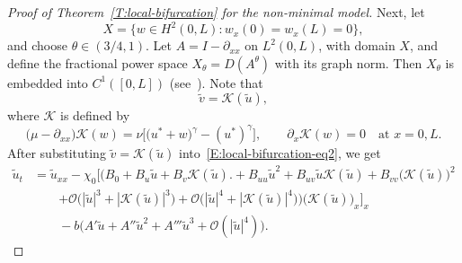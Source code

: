 \documentclass[11pt]{article} %
\theoremstyle{remark}
\theoremstyle{remark}
\numberwithin{equation}{section}
\numberwithin{figure}{section}
\numberwithin{table}{section}
\begin{document}
\begin{proof}[Proof of Theorem~\ref{T:local-bifurcation}  for the non-minimal model]
  Next, let
  \[
    X=\Big\{w\in H^2(0,L):w_x(0)=w_x(L)=0\Big\},
  \]
  and choose $\theta \in (3/4, 1)$.  Let  $A = I - \partial_{xx}$ on $L^2(0,L)$,
  with domain $X$, and define the fractional power space $X_\theta =
  D(A^\theta)$ with its graph norm. Then $X_\theta$ is embedded into $C^1([0,
  L])$ (see~\cite[Theorem 1.6.1]{henry:81:geometric}). Note that
  \[
    \tilde{v}=\mathcal{K}(\tilde{u}),
  \]
  where $\mathcal{K}$ is defined by
  \begin{equation}\label{E:K-operator-eq}
    \Big(\mu-\partial_{xx}\Big)\mathcal{K}(w)
    =\nu\Big[\Big(u^*+w\Big)^\gamma-(u^*)^\gamma\Big],
    \qquad
    \partial_x\mathcal{K}(w)=0\quad\text{at }x=0,L.
  \end{equation}
  After substituting $\widetilde{v} = \mathcal{K}(\tilde{u})$
  into~\eqref{E:local-bifurcation-eq2}, we get
  \begin{align}\label{E:local-bifurcation-eq2-new}
    \tilde{u}_t
    & = \tilde{u}_{xx}
    - \chi_0\Big[\Big(  B_0+B_u\tilde{u}
    + B_v\mathcal{K}(\tilde{u})\Big. \nonumber
    + B_{uu}\tilde{u}^2
    + B_{uv}\tilde{u}\mathcal{K}(\tilde{u})
    + B_{vv}\big(\mathcal{K}(\tilde{u})\big)^2 \nonumber \\
    & \qquad {+ \mathcal{O}\big(|\tilde{u}|^3+|\mathcal{K}(\tilde{u})|^3\big) }
    +
    \mathcal{O}\big(|\tilde{u}|^4+|\mathcal{K}(\tilde{u})|^4\big)\Big)\Big(\mathcal{K}(\tilde{u})\Big)_x\Big]_x
    \nonumber \\
    & \qquad - b\Big( A'\tilde{u}
    + A'' \tilde{u}^2 + A'''\tilde{u}^3
    + \mathcal{O}(|\tilde{u}|^4)\Big).
  \end{align}



\end{proof}
\end{document}
